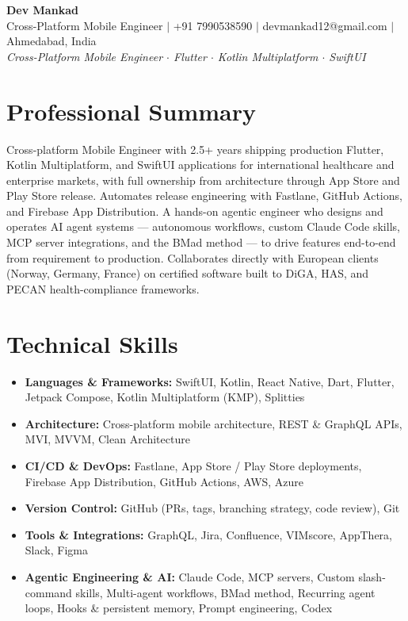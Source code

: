 \documentclass[a4paper,10pt]{article}
\begin{document}
\begin{center}
{\LARGE\bfseries Dev Mankad}\\[3pt]
{\small Cross-Platform Mobile Engineer $\mid$ +91 7990538590 $\mid$ devmankad12@gmail.com $\mid$ Ahmedabad, India}\\[2pt]
{\small\itshape Cross-Platform Mobile Engineer $\cdot$ Flutter $\cdot$ Kotlin Multiplatform $\cdot$ SwiftUI}
\end{center}
\vspace{2pt}
\section*{Professional Summary}
Cross-platform Mobile Engineer with 2.5+ years shipping production Flutter, Kotlin Multiplatform, and SwiftUI applications for international healthcare and enterprise markets, with full ownership from architecture through App Store and Play Store release. Automates release engineering with Fastlane, GitHub Actions, and Firebase App Distribution. A hands-on agentic engineer who designs and operates AI agent systems --- autonomous workflows, custom Claude Code skills, MCP server integrations, and the BMad method --- to drive features end-to-end from requirement to production. Collaborates directly with European clients (Norway, Germany, France) on certified software built to DiGA, HAS, and PECAN health-compliance frameworks.
\section*{Technical Skills}
\begin{itemize}
  \item \textbf{Languages \& Frameworks:} SwiftUI, Kotlin, React Native, Dart, Flutter, Jetpack Compose, Kotlin Multiplatform (KMP), Splitties
  \item \textbf{Architecture:} Cross-platform mobile architecture, REST \& GraphQL APIs, MVI, MVVM, Clean Architecture
  \item \textbf{CI/CD \& DevOps:} Fastlane, App Store / Play Store deployments, Firebase App Distribution, GitHub Actions, AWS, Azure
  \item \textbf{Version Control:} GitHub (PRs, tags, branching strategy, code review), Git
  \item \textbf{Tools \& Integrations:} GraphQL, Jira, Confluence, VIMscore, AppThera, Slack, Figma
  \item \textbf{Agentic Engineering \& AI:} Claude Code, MCP servers, Custom slash-command skills, Multi-agent workflows, BMad method, Recurring agent loops, Hooks \& persistent memory, Prompt engineering, Codex
\end{itemize}
\end{document}
